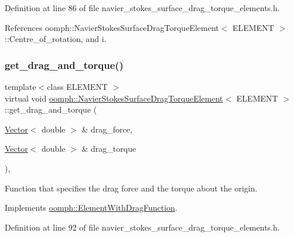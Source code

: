 Definition at line 86 of file navier\+\_\+stokes\+\_\+surface\+\_\+drag\+\_\+torque\+\_\+elements.\+h.



References oomph\+::\+Navier\+Stokes\+Surface\+Drag\+Torque\+Element$<$ E\+L\+E\+M\+E\+N\+T $>$\+::\+Centre\+\_\+of\+\_\+rotation, and i.

\mbox{\label{classoomph_1_1NavierStokesSurfaceDragTorqueElement_a3772165689b96fc7206d2a7c6da3a200}} 
\subsubsection{\texorpdfstring{get\+\_\+drag\+\_\+and\+\_\+torque()}{get\_drag\_and\_torque()}}
{\footnotesize\ttfamily template$<$class E\+L\+E\+M\+E\+NT $>$ \\
virtual void \hyperlink{classoomph_1_1NavierStokesSurfaceDragTorqueElement}{oomph\+::\+Navier\+Stokes\+Surface\+Drag\+Torque\+Element}$<$ E\+L\+E\+M\+E\+NT $>$\+::get\+\_\+drag\+\_\+and\+\_\+torque (\begin{DoxyParamCaption}\item[{\hyperlink{classoomph_1_1Vector}{Vector}$<$ double $>$ \&}]{drag\+\_\+force,  }\item[{\hyperlink{classoomph_1_1Vector}{Vector}$<$ double $>$ \&}]{drag\+\_\+torque }\end{DoxyParamCaption})\hspace{0.3cm}{\ttfamily [inline]}, {\ttfamily [virtual]}}



Function that specifies the drag force and the torque about the origin. 



Implements \hyperlink{classoomph_1_1ElementWithDragFunction_a25eba94e85107e4361476861af2ef274}{oomph\+::\+Element\+With\+Drag\+Function}.



Definition at line 92 of file navier\+\_\+stokes\+\_\+surface\+\_\+drag\+\_\+torque\+\_\+elements.\+h.



